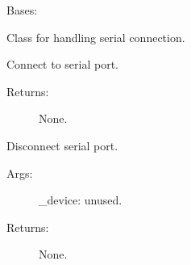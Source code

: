 \documentclass[letterpaper,10pt,english]{sphinxmanual}
\begin{document}
\begin{fulllineitems}
\label{\detokenize{QConnectionLibrary:QConnectionLibrary.serialclient.serial_base.SerialSocket}}
\sphinxAtStartPar
Bases: {\hyperref[\detokenize{QConnectionLibrary:QConnectionLibrary.connection_base.ConnectionBase}]{}}

\sphinxAtStartPar
Class for handling serial connection.

\begin{fulllineitems}
\label{\detokenize{QConnectionLibrary:QConnectionLibrary.serialclient.serial_base.SerialSocket.connect}}
\sphinxAtStartPar
Connect to serial port.
\begin{description}
\item[{Returns:}] \leavevmode
\sphinxAtStartPar
None.

\end{description}

\end{fulllineitems}


\begin{fulllineitems}
\label{\detokenize{QConnectionLibrary:QConnectionLibrary.serialclient.serial_base.SerialSocket.disconnect}}
\sphinxAtStartPar
Disconnect serial port.
\begin{description}
\item[{Args:}] \leavevmode
\sphinxAtStartPar
\_device: unused.

\item[{Returns:}] \leavevmode
\sphinxAtStartPar
None.

\end{description}


\end{fulllineitems}
\end{fulllineitems}
\end{document}
